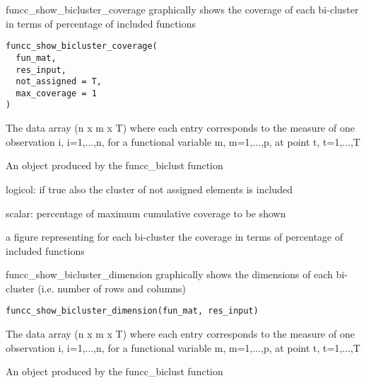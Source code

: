 \documentclass[a4paper]{book}
\begin{document}
%
\begin{Description}\relax
funcc\_show\_bicluster\_coverage graphically shows the coverage of each bi-cluster in terms of percentage of included functions
\end{Description}
%
\begin{Usage}
\begin{verbatim}
funcc_show_bicluster_coverage(
  fun_mat,
  res_input,
  not_assigned = T,
  max_coverage = 1
)
\end{verbatim}
\end{Usage}
%
\begin{Arguments}
\begin{ldescription}
\item[\code{fun\_mat}] The data array (n x m x T) where each entry corresponds to the measure of one observation i, i=1,...,n, for a functional variable m, m=1,...,p, at point t, t=1,...,T

\item[\code{res\_input}] An object produced by the funcc\_biclust function

\item[\code{not\_assigned}] logicol: if true also the cluster of not assigned elements is included

\item[\code{max\_coverage}] scalar: percentage of maximum cumulative coverage to be shown
\end{ldescription}
\end{Arguments}
%
\begin{Value}
a figure representing for each bi-cluster the coverage in terms of percentage of included functions
\end{Value}
%
\begin{Description}\relax
funcc\_show\_bicluster\_dimension graphically shows the dimensions of each bi-cluster (i.e. number of rows and columns)
\end{Description}
%
\begin{Usage}
\begin{verbatim}
funcc_show_bicluster_dimension(fun_mat, res_input)
\end{verbatim}
\end{Usage}
%
\begin{Arguments}
\begin{ldescription}
\item[\code{fun\_mat}] The data array (n x m x T) where each entry corresponds to the measure of one observation i, i=1,...,n, for a functional variable m, m=1,...,p, at point t, t=1,...,T

\item[\code{res\_input}] An object produced by the funcc\_biclust function
\end{ldescription}
\end{Arguments}
\end{document}

